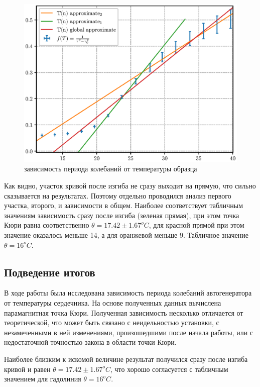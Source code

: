 \documentclass[12pt,a4paper]{article}
\begin{document}
\begin{figure}[H]
    \centering
    \includegraphics[width=\linewidth]{pics/ft.eps}
    \caption{зависимость периода колебаний от температуры образца}
\end{figure}

Как видно, участок кривой после изгиба не сразу выходит на прямую, что сильно сказывается на результатах.
Поэтому отдельно проводился анализ первого участка, второго, и зависимости в общем.
Наиболее соответствует табличным значениям зависимость сразу после изгиба (зеленая прямая), при этом точка Кюри равна соответственно $\theta = 17.42 \pm 1.67 ^oC$, для красной прямой при этом значение оказалось меньше 14, а для оранжевой меньше 9.
Табличное значение $\theta = 16^oC$.
\subsection*{Подведение итогов}
В ходе работы была исследована зависимость периода колебаний автогенератора от температуры сердечника. 
На основе полученных данных вычислена парамагнитная точка Кюри.
Полученная зависимость несколько отличается от теоретической, что может быть связано с неидельностью установки, с незамеченными в ней изменениями, произошедшими после начала работы, или с недостаточной точностью закона в области точки Кюри.

Наиболее близким к искомой величине результат получился сразу после изгиба кривой и равен $\theta = 17.42 \pm 1.67 ^oC$, что хорошо согласуется с табличным значением для гадолиния $\theta = 16 ^oC$.
\end{document}
